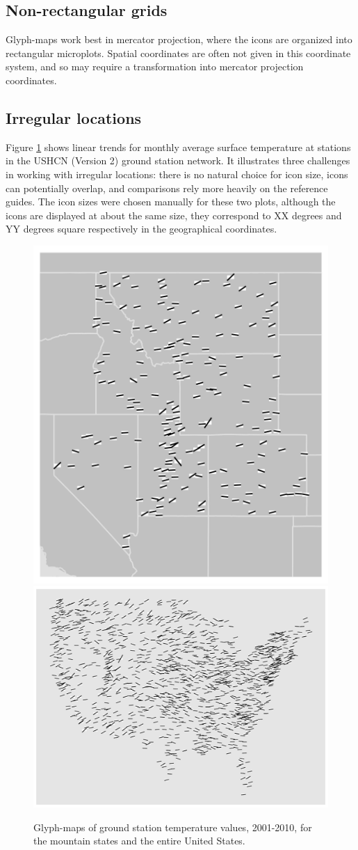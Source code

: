 \documentclass[oneside]{article}
\begin{document}
\subsection{Non-rectangular grids}

Glyph-maps work best in mercator projection, where the icons are organized into rectangular microplots. Spatial coordinates are often not given in this coordinate system, and so may require a transformation into mercator projection coordinates.

\subsection{Irregular locations}
Figure \ref{fig:irregular} shows linear trends for monthly average surface temperature at stations in the USHCN (Version 2) ground station network.  It illustrates three challenges in working with irregular locations: there is no natural choice for icon size, icons can potentially overlap, and comparisons rely more heavily on the reference guides.  The icon sizes were chosen manually for these two plots, although the icons are displayed at about the same size, they correspond to XX degrees and YY degrees square respectively in the geographical coordinates. 
\begin{figure}[htbp]
  \centering
  \includegraphics[width=0.4\linewidth]{ghcn-mountains}%
  \includegraphics[width=0.6\linewidth]{usa-lin-overlap}%
  \caption{Glyph-maps of ground station temperature values, 2001-2010, for the mountain states and the entire United States.} %
  \label{fig:irregular}
\end{figure}
\end{document}
